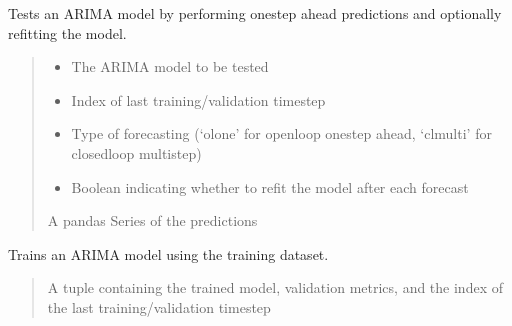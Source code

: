 \documentclass[letterpaper,10pt,english]{sphinxmanual}
\begin{document}
\begin{fulllineitems}
\begin{fulllineitems}
\label{\detokenize{docs/ARIMA_model:ARIMA_model.ARIMA_Predictor.test_model}}
\pysigstartsignatures
{}
\pysigstopsignatures
\sphinxAtStartPar
Tests an ARIMA model by performing one\sphinxhyphen{}step ahead predictions and optionally refitting the model.
\begin{quote}\begin{description}
\begin{itemize}
\item {} 
\sphinxAtStartPar
{} \textendash{} The ARIMA model to be tested

\item {} 
\sphinxAtStartPar
{} \textendash{} Index of last training/validation timestep

\item {} 
\sphinxAtStartPar
{} \textendash{} Type of forecasting (‘ol\sphinxhyphen{}one’ for open\sphinxhyphen{}loop one\sphinxhyphen{}step ahead, ‘cl\sphinxhyphen{}multi’ for closed\sphinxhyphen{}loop multi\sphinxhyphen{}step)

\item {} 
\sphinxAtStartPar
{} \textendash{} Boolean indicating whether to refit the model after each forecast

\end{itemize}

\sphinxAtStartPar
A pandas Series of the predictions

\end{description}\end{quote}

\end{fulllineitems}


\begin{fulllineitems}
\label{\detokenize{docs/ARIMA_model:ARIMA_model.ARIMA_Predictor.train_model}}
\pysigstartsignatures
{}
\pysigstopsignatures
\sphinxAtStartPar
Trains an ARIMA model using the training dataset.
\begin{quote}\begin{description}
\sphinxAtStartPar
A tuple containing the trained model, validation metrics, and the index of the last training/validation timestep


\end{description}
\end{quote}
\end{fulllineitems}
\end{fulllineitems}
\end{document}
